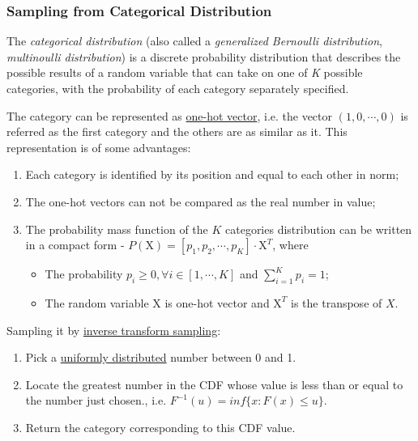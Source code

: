 \documentclass[titlestyle=hang,11pt]{elegantbook}
\begin{document}
\subsubsection{Sampling from Categorical Distribution}

The \emph{categorical distribution} (also called  a \emph{generalized Bernoulli distribution}, \emph{multinoulli distribution}) is a discrete probability distribution that describes the possible results of a random variable that can take on one of \emph{K} possible categories, with the probability of each category separately specified.

The category can be represented as \href{https://www.wikiwand.com/en/One-hot#/overview}{one-hot vector}, i.e. the vector $(1,0,\cdots, 0)$ is referred as the first category and the others are as similar as it. This representation is of some advantages:
\begin{enumerate}
  \item Each category is identified by its position and equal to each other in norm;
  \item The one-hot vectors can not be compared as the real number  in value;
  \item The probability mass function of the $K$ categories distribution can be written in a compact form - $P(\mathrm{X})=[p_1,p_2, \cdots, p_K]\cdot \mathrm{X}^T$,
  where
  \begin{itemize}
   \item The probability $p_i \geq 0, \forall i\in [1,\cdots, K]$ and $\sum_{i=1}^{K}p_i=1$;
   \item The random variable $\mathrm{X}$ is one-hot vector and $\mathrm{X}^T$ is the transpose of $X$.
  \end{itemize}
\end{enumerate}

Sampling it by  \href{https://www.wikiwand.com/en/Inverse_transform_sampling}{inverse transform sampling}:
\begin{enumerate}
  \item Pick a \href{https://www.wikiwand.com/en/Uniform_distribution_(continuous)}{uniformly distributed} number between 0 and 1.
  \item Locate the greatest number in the CDF whose value is less than or equal to the number just chosen., i.e. $F^{-1}(u)=inf\{x: F(x) \leq u\}$.
  \item Return the category corresponding to this CDF value.
\end{enumerate}
\end{document}

